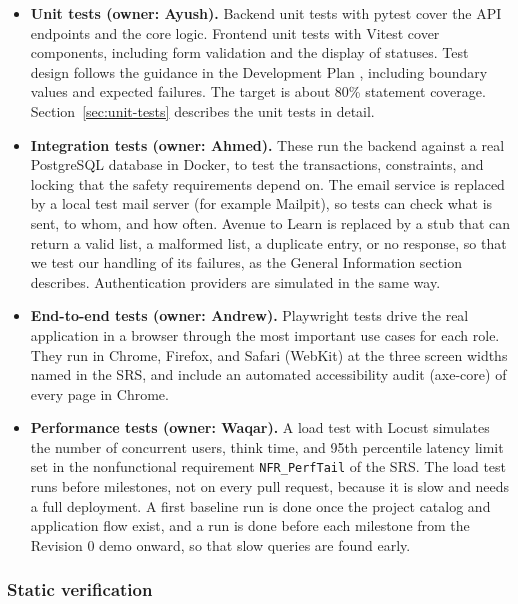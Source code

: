 \documentclass[12pt, titlepage]{article}
\begin{document}
  \begin{itemize}
    \item \textbf{Unit tests (owner: Ayush).} Backend unit tests with pytest cover the API endpoints and the
    core logic. Frontend unit tests with Vitest cover components, including form validation and the display of statuses.
    Test design follows the guidance in the Development Plan \citep{DevelopmentPlan},
    including boundary values and expected failures.
    The target is about 80\% statement coverage. Section~\ref{sec:unit-tests} describes the unit tests in detail.
    \item \textbf{Integration tests (owner: Ahmed).} These run the backend against a real PostgreSQL database
    in Docker, to test the transactions, constraints, and locking that the safety requirements depend on.
    The email service is replaced by a local test mail server (for example Mailpit), so tests can check what is sent,
    to whom, and how often. Avenue to Learn is replaced by a stub that can return a valid list,
    a malformed list, a duplicate entry, or no response, so that we test our handling of its failures,
    as the General Information section describes. Authentication providers are simulated in the same way.
    \item \textbf{End-to-end tests (owner: Andrew).} Playwright tests drive the real application in a
    browser through the most important use cases for each role.
    They run in Chrome, Firefox, and Safari (WebKit) at the three screen widths named in the SRS, and include
    an automated accessibility audit (axe-core) of every page in Chrome.
    \item \textbf{Performance tests (owner: Waqar).} A load test with Locust simulates the number of
    concurrent users, think time, and 95th percentile latency limit set in the nonfunctional requirement
    \texttt{NFR\_PerfTail} of the SRS. The load test runs before milestones, not on every pull request,
    because it is slow and needs a full deployment. A first baseline run is done once the project catalog and
    application flow exist, and a run is done before each milestone from the Revision 0 demo onward, so that
    slow queries are found early.
  \end{itemize}

  \subsubsection*{Static verification}
\end{document}
